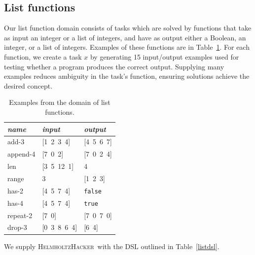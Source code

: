 \documentclass{article}
\newcommand{\system}{\textsc{HelmholtzHacker}~}
\begin{document}
\subsection{List functions}
Our list function domain consists of tasks which are solved by functions
that take as input an integer or a list of integers, and have as output
either a Boolean, an integer, or a list of integers. Examples of these
functions are in Table~\ref{listexamples}. For each function, we create a
task $x$ by generating 15 input/output examples used for testing whether a
program produces the correct output. Supplying many examples reduces
ambiguity in the task's function, ensuring solutions achieve the desired
concept.

\begin{table}
\centering
\begin{tabular}{| l | l | l |}
  \hline
  \emph{name} & \emph{input} & \emph{output} \\
  \hline
  add-3 & [1\, 2\, 3\, 4] & [4\, 5\, 6\, 7] \\
  append-4 & [7\, 0\, 2] & [7\, 0\, 2\, 4] \\
  len & [3\, 5\, 12\, 1] & 4 \\
  range & 3 & [1\, 2\, 3] \\
  has-2 & [4\, 5\, 7\, 4] & \texttt{false} \\
  has-4 & [4\, 5\, 7\, 4] & \texttt{true} \\
  repeat-2 & [7\, 0] & [7\, 0\, 7\, 0] \\
  drop-3 & [0\, 3\, 8\, 6\, 4] & [6\, 4] \\
  \hline
\end{tabular}
\caption{Examples from the domain of list functions.}
\label{listexamples}
\end{table}

We supply \system with the DSL outlined in Table~\ref{listdsl}.
\end{document}
